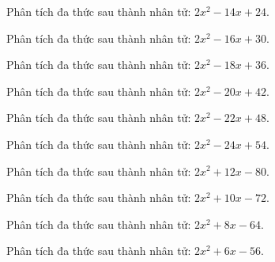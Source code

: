 \begin{bt}
	Phân tích đa thức sau thành nhân tử: $2 x^2 - 14 x + 24$.
\end{bt}
\begin{bt}
	Phân tích đa thức sau thành nhân tử: $2 x^2 - 16 x + 30$.
\end{bt}
\begin{bt}
	Phân tích đa thức sau thành nhân tử: $2 x^2 - 18 x + 36$.
\end{bt}
\begin{bt}
	Phân tích đa thức sau thành nhân tử: $2 x^2 - 20 x + 42$.
\end{bt}
\begin{bt}
	Phân tích đa thức sau thành nhân tử: $2 x^2 - 22 x + 48$.
\end{bt}
\begin{bt}
	Phân tích đa thức sau thành nhân tử: $2 x^2 - 24 x + 54$.
\end{bt}
\begin{bt}
	Phân tích đa thức sau thành nhân tử: $2 x^2 + 12 x - 80$.
\end{bt}
\begin{bt}
	Phân tích đa thức sau thành nhân tử: $2 x^2 + 10 x - 72$.
\end{bt}
\begin{bt}
	Phân tích đa thức sau thành nhân tử: $2 x^2 + 8 x - 64$.
\end{bt}
\begin{bt}
	Phân tích đa thức sau thành nhân tử: $2 x^2 + 6 x - 56$.
\end{bt}
